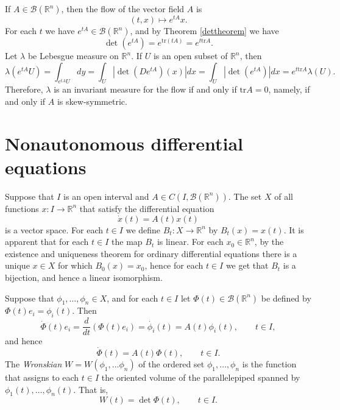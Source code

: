 \documentclass{article}
\newcommand{\tr}{\textrm{tr}}
\begin{document}
If $A \in \mathscr{B}(\mathbb{R}^n)$, then the flow of the vector field $A$ is 
\[
(t,x) \mapsto e^{tA}x.
\]
For each $t$ we have $e^{tA} \in \mathscr{B}(\mathbb{R}^n)$, and by Theorem \ref{dettheorem} we have
\[
\det(e^{tA})= e^{\tr (tA)} = e^{t\tr A}.
\]
Let $\lambda$ be Lebesgue measure on $\mathbb{R}^n$. If $U$ is an open subset of $\mathbb{R}^n$, then
\[
\lambda(e^{tA}U) = \int_{e^{tA}U} dy= \int_U |\det(De^{tA})(x)| dx = \int_U |\det(e^{tA})| dx  = e^{t\tr A} \lambda(U).
\]
Therefore,  $\lambda$ is an invariant measure for the flow if and only if $\tr A=0$, namely, if and only if $A$ is skew-symmetric.


\section{Nonautonomous differential equations}
Suppose that $I$ is an open interval and $A \in C(I, \mathscr{B}(\mathbb{R}^n))$.
The set $X$ of all functions $x:I \to \mathbb{R}^n$ that satisfy   the differential equation
\[
\dot{x}(t)=A(t)x(t)
\]
is a vector space.
For each $t \in I$ we define $B_t:X \to \mathbb{R}^n$ by $B_t(x)=x(t)$. It is apparent that
for each $t \in I$ the map $B_t$ is linear.
For each $x_0 \in \mathbb{R}^n$, by the existence and uniqueness theorem for ordinary differential equations there is a unique $x \in X$ for
which $B_0(x)=x_0$, hence for each $t \in I$ we get that $B_t$ is a bijection, and hence a linear isomorphism.

Suppose that $\phi_1,\ldots,\phi_n \in X$, 
and for each $t \in I$ let $\Phi(t) \in \mathscr{B}(\mathbb{R}^n)$ be defined by $\Phi(t)e_i = \phi_i(t)$. Then
\[
\dot{\Phi}(t)e_i = \frac{d}{dt}(\Phi(t)e_i) = \dot{\phi_i}(t) = A(t)\phi_i(t), \qquad t \in I,
\]
and hence 
\begin{equation}
\dot{\Phi}(t) = A(t) \Phi(t), \qquad t \in I.
\label{Phidot}
\end{equation}
The {\em Wronskian} $W=W(\phi_1,\ldots\phi_n)$ of the ordered set $\phi_1,\ldots,\phi_n$
is the function that assigns to each $t \in I$ the  oriented volume of the parallelepiped spanned by $\phi_1(t),\ldots,\phi_n(t)$. That is,
\[
W(t)=\det \Phi(t), \qquad t \in I.
\]
\end{document}
